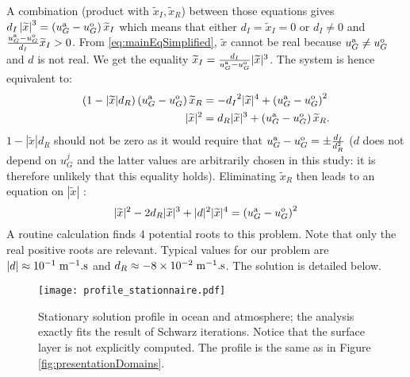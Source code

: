 A combination (product with ${\widetilde{x}_I}, \widetilde{x}_R$)
between those equations gives
${d_I}\left|\widetilde{x}\right|^3 = \left(u_G^{\rm a} - u_G^{\rm o}\right) {\widetilde{x}_I}$ which means that either ${d_I}=\widetilde{x}_I=0$ or ${d_I}\neq 0$ and $\frac{u_G^{\rm a} - u_G^{\rm o}}{{d_I}}{\widetilde{x}_I}>0$.
From \eqref{eq:mainEqSimplified}, $\widetilde{x}$ cannot be real because $u_G^{\rm a} \neq u_G^{\rm o}$ and $d$ is not real.
We get the equality
$\widetilde{x}_I = \frac{{d_I}}{u_G^{\rm a} - u_G^{\rm o}} |\widetilde{x}|^3$.
The system is hence equivalent to:
\begin{equation}
    \begin{aligned}
    \left(1 - |\widetilde{x}| d_R\right)
    \left(u_G^{\rm a} - u_G^{\rm o}\right)\widetilde{x}_R &=
    -{d_I}^2 |\widetilde{x}|^4 + \left(u_G^{\rm a} - u_G^{\rm o}\right)^2 \\
    |\widetilde{x}|^2 &=
    {d_R} |\widetilde{x}|^3 + \left(u_G^{\rm a} - u_G^{\rm o}\right)\widetilde{x}_R.
    \end{aligned}
\end{equation}
$1 - |\widetilde{x}| d_R$ should not be zero as it would require that $u_G^{\rm a} - u_G^{\rm o} = \pm \frac{d_I}{d_R^2}$ ($d$ does not depend on $u_G^j$ and the latter values are arbitrarily chosen in this study:
it is therefore unlikely that this equality holds).
Eliminating $\widetilde{x}_R$ then leads to an equation on $|\widetilde{x}|$ :
\begin{equation} \label{eq:mainPolynomial}
    |\widetilde{x}|^2 -  2{d_R} |\widetilde{x}|^3 + 
    |d|^2 |\widetilde{x}|^4
    =\left(u_G^{\rm a} - u_G^{\rm o}\right)^2
\end{equation}
A routine calculation finds 4 potential roots to this problem. Note that only the real positive roots are relevant.
Typical values for our problem are 
$|d| \approx 10^{-1} \;{\rm m}^{-1}.{\rm s}$ and
$d_R \approx -8 \times 10^{-2}\;{\rm m}^{-1}.{\rm s}$.
The solution is detailed below.
\begin{figure}[h]
    \centering
    \texttt{[image: profile\_stationnaire.pdf]}
    \caption{Stationary solution profile in ocean and atmosphere;
	the analysis exactly fits the result of Schwarz iterations.
	Notice that the surface layer is not explicitly computed.
	The profile is the same as in Figure \ref{fig:presentationDomains}.}
    \label{fig:validation}
\end{figure}
